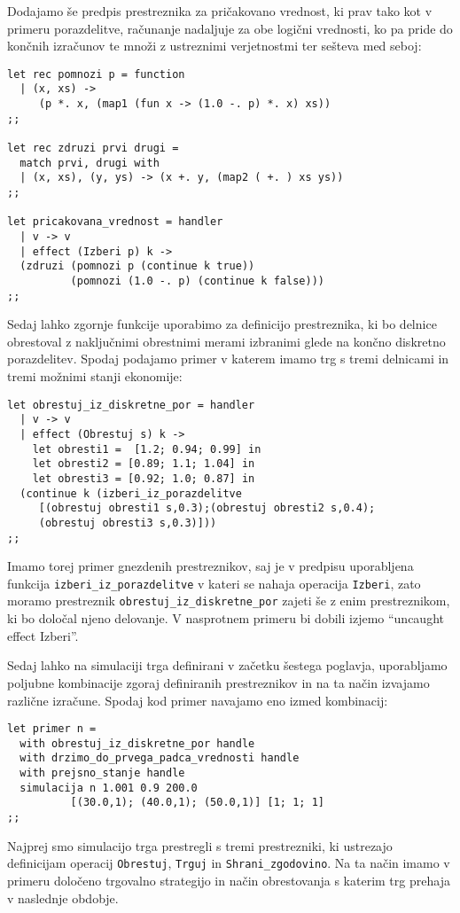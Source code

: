 \documentclass[a4paper,12pt]{article}
\theoremstyle{definition} %
\begin{document}
Dodajamo še predpis prestreznika za pričakovano vrednost, ki prav tako kot v primeru porazdelitve, računanje nadaljuje za obe logični vrednosti, ko pa pride do končnih izračunov te množi z ustreznimi verjetnostmi ter sešteva med seboj:
\begin{lstlisting}
let rec pomnozi p = function
  | (x, xs) -> 
     (p *. x, (map1 (fun x -> (1.0 -. p) *. x) xs))
;;

let rec zdruzi prvi drugi =
  match prvi, drugi with
  | (x, xs), (y, ys) -> (x +. y, (map2 ( +. ) xs ys))
;;

let pricakovana_vrednost = handler
  | v -> v
  | effect (Izberi p) k ->
  (zdruzi (pomnozi p (continue k true))
  	      (pomnozi (1.0 -. p) (continue k false)))
;;
\end{lstlisting}
Sedaj lahko zgornje funkcije uporabimo za definicijo prestreznika, ki bo delnice obrestoval z naključnimi obrestnimi merami izbranimi glede na končno diskretno porazdelitev. Spodaj podajamo primer v katerem imamo trg s tremi delnicami in tremi možnimi stanji ekonomije:
\begin{lstlisting}
let obrestuj_iz_diskretne_por = handler
  | v -> v
  | effect (Obrestuj s) k ->
    let obresti1 =  [1.2; 0.94; 0.99] in
    let obresti2 = [0.89; 1.1; 1.04] in
    let obresti3 = [0.92; 1.0; 0.87] in
  (continue k (izberi_iz_porazdelitve
     [(obrestuj obresti1 s,0.3);(obrestuj obresti2 s,0.4);
     (obrestuj obresti3 s,0.3)]))
;;
\end{lstlisting}
Imamo torej primer gnezdenih prestreznikov, saj je v predpisu uporabljena funkcija \lstinline{izberi_iz_porazdelitve} v kateri se nahaja operacija \lstinline{Izberi}, zato moramo prestreznik \lstinline{obrestuj_iz_diskretne_por} zajeti še z enim prestreznikom, ki bo določal njeno delovanje. V nasprotnem primeru bi dobili izjemo "`uncaught effect Izberi"'.


Sedaj lahko na simulaciji trga definirani v začetku šestega poglavja, uporabljamo poljubne kombinacije zgoraj definiranih prestreznikov in na ta način izvajamo različne izračune. Spodaj kod primer navajamo eno izmed kombinacij:
\begin{lstlisting}
let primer n =
  with obrestuj_iz_diskretne_por handle
  with drzimo_do_prvega_padca_vrednosti handle
  with prejsno_stanje handle
  simulacija n 1.001 0.9 200.0 
          [(30.0,1); (40.0,1); (50.0,1)] [1; 1; 1]
;;
\end{lstlisting}
Najprej smo simulacijo trga prestregli s tremi prestrezniki, ki ustrezajo definicijam operacij \lstinline{Obrestuj}, \lstinline{Trguj} in \lstinline{Shrani_zgodovino}. Na ta način imamo v primeru določeno trgovalno strategijo in način obrestovanja s katerim trg prehaja v naslednje obdobje.
\end{document}
